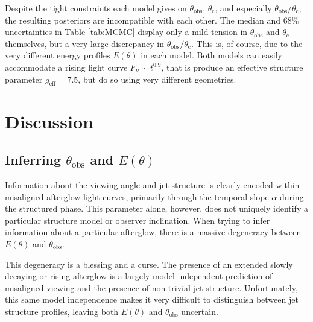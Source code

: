 \documentclass[twocolumn]{aastex62}
\newcommand{\thobs}{\ensuremath{\theta_{\mathrm{obs}}}}
\newcommand{\thC}{\ensuremath{\theta_{\mathrm{c}}}}
\newcommand{\geff}{\ensuremath{g_{\mathrm{eff}}}}
\begin{document}
Despite the tight constraints each model gives on $\thobs$, $\thC$, and especially $\thobs/\thC$, the resulting posteriors are incompatible with each other.  The median and 68\% uncertainties in Table \ref{tab:MCMC} display only a mild tension in $\thobs$  and $\thC$ themselves, but a very large discrepancy in $\thobs/\thC$.  This is, of course, due to the very different energy profiles $E(\theta)$ in each model.  Both models can easily accommodate a rising light curve $F_\nu \sim t^{0.9}$, that is produce an effective structure parameter $\geff = 7.5$, but do so using very different geometries.  


%
%

\section{Discussion}\label{sec:discussion}

\subsection{Inferring $\thobs$ and $E(\theta)$}

Information about the viewing angle and jet structure is clearly encoded within misaligned afterglow light curves, primarily through the temporal slope $\alpha$ during the structured phase.   This parameter alone, however, does not uniquely identify a particular structure model or observer inclination.  When trying to infer information about a particular afterglow, there is a massive degeneracy between $E(\theta)$ and $\thobs$.  

This degeneracy is a blessing and a curse.  The presence of an extended slowly decaying or rising afterglow is a largely model independent prediction of misaligned viewing and the presence of non-trivial jet structure.  Unfortunately, this same model independence makes it very difficult to distinguish between jet structure profiles, leaving both $E(\theta)$ and $\thobs$ uncertain.
\end{document}
